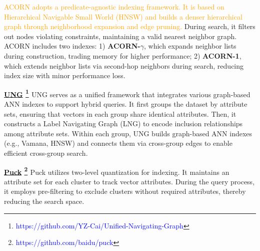 \documentclass[sigconf, nonacm]{acmart}
\begin{document}
{%
	\textcolor{orange}{ACORN adopts a predicate-agnostic indexing framework. It is based on Hierarchical Navigable Small World (HNSW) \cite{hnsw} and builds a denser hierarchical graph through neighborhood expansion and edge pruning.}
	During search, it filters out nodes violating constraints, maintaining a valid nearest neighbor graph.
	ACORN includes two indexes: 1) \textbf{ACORN-$\gamma$}, which expands neighbor lists during construction, trading memory for higher performance; 
	2) \textbf{ACORN-1}, which extends neighbor lists via second-hop neighbors during search, reducing index size with minor performance loss.
	
	\noindent\textbf{\underline{UNG} \footnote{\textcolor{blue}{https://github.com/YZ-Cai/Unified-Navigating-Graph}} \cite{UNG}} 
	UNG serves as a unified framework that integrates various graph-based ANN indexes to support hybrid queries. It first groups the dataset by attribute sets, ensuring that vectors in each group share identical attributes. Then, it constructs a Label Navigating Graph (LNG) to encode inclusion relationships among attribute sets. Within each group, UNG builds graph-based ANN indexes (e.g., Vamana, HNSW) and connects them via cross-group edges to enable efficient cross-group search.
	
	
	
	\noindent\textbf{\underline{Puck} \footnote{\textcolor{blue}{https://github.com/baidu/puck}} \cite{puck}} 
	Puck utilizes two-level quantization for indexing. It maintains an attribute set for each cluster to track vector attributes. During the query process, it employs pre-filtering to exclude clusters without required attributes, thereby reducing the search space.
	
}
\end{document}
